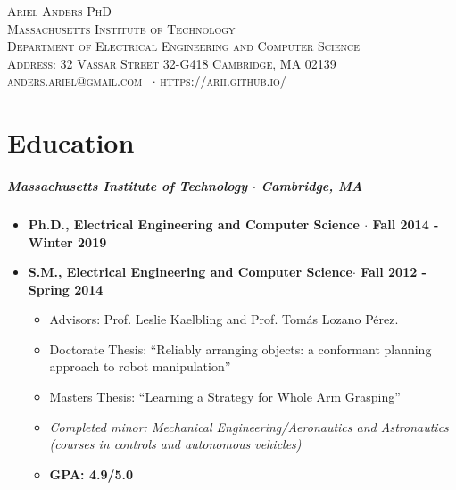 \documentclass[10pt,letterpaper]{article}
\newcommand{\namestyle}{\Large \scshape}
\newcommand{\deptstyle}{\footnotesize \rmfamily \scshape}
\newcommand{\addressstyle}{\footnotesize \rmfamily \upshape}
\begin{document}
\begin{center}
\namestyle Ariel Anders PhD \\[0.3em]
\deptstyle Massachusetts Institute of Technology \\Department of Electrical Engineering and Computer Science\\[0.2em]
\addressstyle Address: 32 Vassar Street 32-G418 Cambridge, MA 02139\\
    anders.ariel@gmail.com \ $\cdot$ https://arii.github.io/
\end{center}


\section*{Education}
 \subparagraph{Massachusetts Institute of Technology $\cdot$ Cambridge, MA}

\begin{itemize}
    \item {\bf Ph.D., Electrical Engineering and Computer Science $\cdot$ Fall 2014 - Winter 2019}
    \item {\bf S.M., Electrical Engineering and Computer Science$\cdot$ Fall 2012 - Spring 2014}

 	\begin{itemize}
        \item Advisors: Prof. Leslie Kaelbling and Prof. Tom\'as Lozano P\'erez.
	    \item Doctorate Thesis: ``Reliably arranging objects: a conformant planning approach to robot manipulation''
	    \item Masters Thesis: ``Learning a Strategy for Whole Arm Grasping''
        \item {\em Completed minor: Mechanical Engineering/Aeronautics and Astronautics\\
                (courses in controls and autonomous vehicles)}
        \item {\bf GPA:  4.9/5.0 }
	\end{itemize}
\end{itemize}
\end{document}
